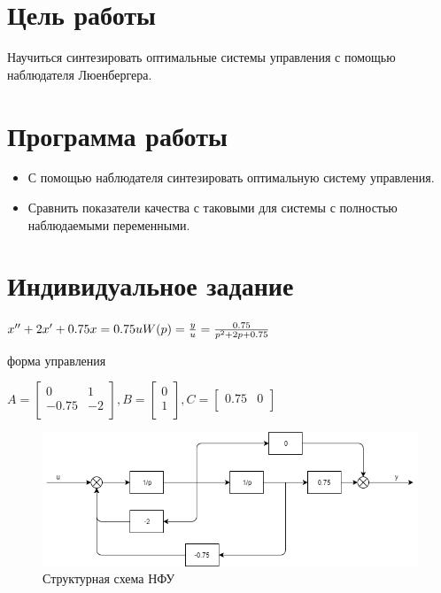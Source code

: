 






\def\contentsname{Содержание}
\tableofcontents
\newpage

\section{Цель работы}

Научиться синтезировать оптимальные системы управления с помощью наблюдателя Люенбергера.

\section{Программа работы}

\begin{itemize}
	\item С помощью наблюдателя  синтезировать оптимальную систему управления.
	\item Сравнить показатели качества с таковыми для системы с полностью наблюдаемыми переменными.
\end{itemize}

\section{Индивидуальное задание}

$
\\
x'' + 2x' + 0.75x = 0.75u\\\\
W(p)=\frac{y}{u}=\frac{0.75}{p^2+2p+0.75} \\
$

 форма управления

\noindent$A=
	\begin{bmatrix}
	0 & 1 \\
	-0.75 & -2 \\
	\end{bmatrix}
	, B=
	\begin{bmatrix}
	0 \\
	1 \\
	\end{bmatrix}
	, C=
	\begin{bmatrix}
	0.75 & 0 \\
	\end{bmatrix}
	$
	
\begin{figure}[h!]
	\centering
	\includegraphics[scale = 0.73]{images/nfu.png}
	\caption{Структурная схема НФУ}
	\label{image:1}
\end{figure}	
\FloatBarrier

